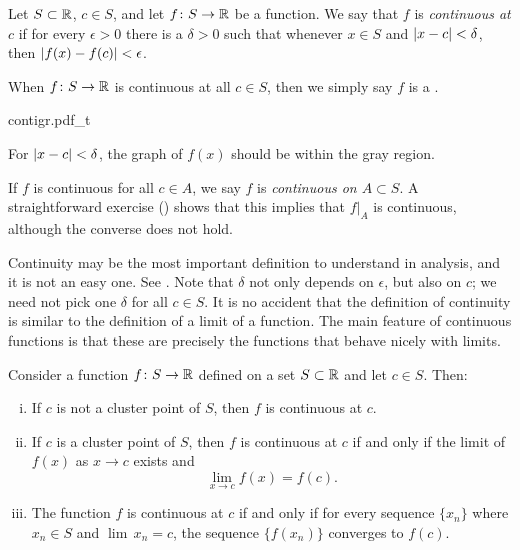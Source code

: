 \begin{defn}
Let $S \subset {\mathbb{R}}$, $c \in S$, and let $f \colon S \to {\mathbb{R}}$ be a function.
We say
that $f$ is \emph{continuous at $c$}
if for every $\epsilon > 0$
there is a $\delta > 0$ such that whenever $x \in S$ and $\left\lvert {x-c} \right\rvert <
\delta$, then
$\left\lvert {f(x)-f(c)} \right\rvert < \epsilon$.


When $f \colon S \to {\mathbb{R}}$ is continuous at all $c \in S$, then we simply say
$f$ is a \emph{}.
\end{defn}
\begin{myfigureht}
{contigr.pdf_t}
\caption{For $\left\lvert {x-c} \right\rvert < \delta$, the graph of $f(x)$ should be within the gray region.\label{fig:contigr}}
\end{myfigureht}

If $f$ is continuous for all $c \in A$, we say
$f$ is \emph{continuous on $A \subset S$}.  A straightforward
exercise ()
shows that this implies that $f|_A$ is continuous, although
the converse does not hold.

Continuity may be the most important definition to understand in analysis,
and it is not an easy one.  See .
Note that $\delta$ not only
depends on $\epsilon$, but also on $c$;  we need not pick
one $\delta$ for all $c \in S$.
It is no accident 
that the definition of continuity is similar to the definition of a
limit of a function.  The main feature of continuous functions
is that these are precisely the functions that behave nicely with limits.

\begin{prop} \label{contbasic:prop}
Consider a function $f \colon S \to {\mathbb{R}}$ defined on a set  $S \subset {\mathbb{R}}$
and let $c \in S$.
Then:
\begin{enumerate}[(i)]
\item If $c$ is not a cluster point of $S$, then $f$ is continuous at $c$.
\item If $c$ is a cluster point of $S$, then $f$ is continuous at $c$
if and only if the limit of $f(x)$ as $x \to c$ exists and
\begin{equation*}
\lim_{x\to c} f(x) = f(c) .
\end{equation*}
\item The function $f$ is continuous at $c$ if and only if for every sequence $\{ x_n \}$
where $x_n \in S$ and $\lim\, x_n = c$, the sequence $\{ f(x_n) \}$ converges
to $f(c)$.
\end{enumerate}
\end{prop}

